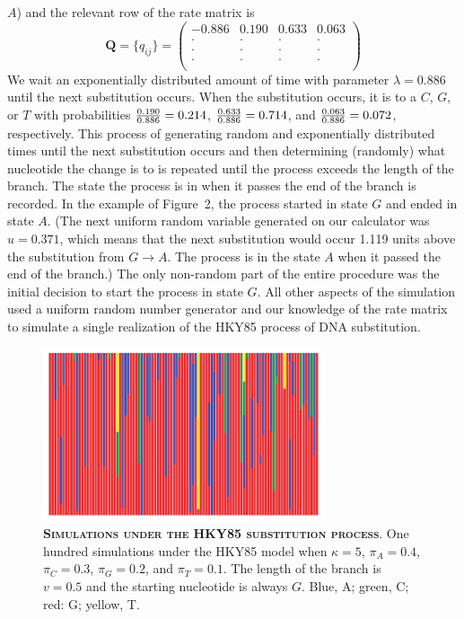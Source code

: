 \documentclass{svmult}
\begin{document}
$A$) and the relevant row of the rate matrix is
$$
{\mathbf Q} = \{q_{ij}\} = \left( \begin{array}{cccc}
-0.886 &  0.190 &  0.633 &  0.063 \\
\cdot & \cdot &  \cdot &  \cdot \\
\cdot &  \cdot & \cdot &  \cdot \\
\cdot &  \cdot &  \cdot & \cdot \\
\end{array} \right)
$$
We wait an exponentially distributed amount of time with parameter
$\lambda = 0.886$ until the next substitution occurs. When the substitution occurs, it is to a $C$, $G$, or $T$
with probabilities ${0.190 \over 0.886} = 0.214$, ${0.633 \over 0.886} = 0.714$, and ${0.063 \over 0.886} = 0.072$,
respectively. This process of generating random and exponentially distributed times until the next substitution occurs
and then determining (randomly) what nucleotide the change is to is repeated until the process exceeds the length
of the branch. The state the process is in when it passes the end of the branch is recorded. In the example of Figure~2,
the process started in state $G$ and ended in state $A$. (The next uniform random variable generated on our
calculator was $u = 0.371$, which means that the next substitution would occur 1.119 units above the substitution
from $G \rightarrow A$. The process is in the state $A$ when it passed the end of the branch.)
The only non-random part of the entire procedure was the initial
decision to start the process in state $G$. All other aspects of the simulation used a uniform random number generator
and our knowledge of the rate matrix to simulate a single realization of the HKY85 process of DNA substitution. 

\begin{figure}[t]
\centering
\includegraphics[height=2in]{fig3}
\caption{\textbf{\textsc{Simulations under the HKY85 substitution process}}.
One hundred simulations under the HKY85 model when 
$\kappa = 5$, $\pi_A = 0.4$, $\pi_C = 0.3$, $\pi_G = 0.2$, and $\pi_T = 0.1$. The length of the branch
is $v = 0.5$ and the starting nucleotide is always $G$. Blue, A; green, C; red: G; yellow, T. 
}
\label{fig3}
\end{figure}
\end{document}
